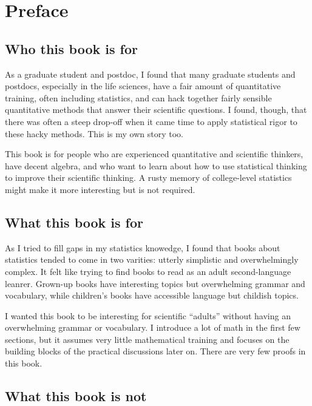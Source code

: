 
\chapter{Preface}

\section*{Who this book is for}

As a graduate student and postdoc, I found that many graduate
students and postdocs, especially in the life sciences, have a fair amount of quantitative
training, often including statistics, and can hack together
fairly sensible quantitative methods that answer their scientific questions. I
found, though, that there was often a steep drop-off when it came time to apply
statistical rigor to these hacky methods. This is my
own story too.

This book is for people who are experienced quantitative and scientific
thinkers, have decent algebra, and who want to learn
about how to use statistical thinking to improve their scientific thinking.
A rusty memory of college-level statistics might make it more interesting
but is not required.

\section*{What this book is for}

As I tried to fill gaps in my statistics knowedge, I found that books about
statistics tended to come in two varities: utterly simplistic and
overwhelmingly complex. It felt like trying to find books to read as an
adult second-language leanrer.
Grown-up books have interesting topics but overwhelming grammar and vocabulary,
while children's books have accessible language but childish topics.

I wanted this book to be interesting for scientific ``adults'' without having
an overwhelming grammar or vocabulary. I introduce a lot of math in the first
few sections, but it assumes very little mathematical training and focuses on
the building blocks of the practical discussions later on. There are very few
proofs in this book.

\section*{What this book is not}

